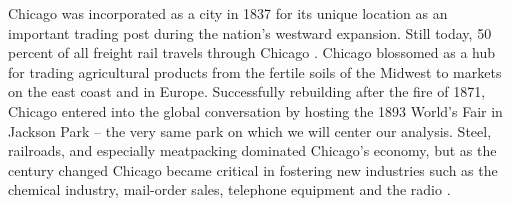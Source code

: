 \documentclass[12pt]{article}
\begin{document}
Chicago was incorporated as a city in 1837 for its unique location as an important trading post during the nation's westward expansion. Still today, 50 percent of all freight rail travels through Chicago \citep{chicagohistory}. Chicago blossomed as a hub for trading agricultural products from the fertile soils of the Midwest to markets on the east coast and in Europe. Successfully rebuilding after the fire of 1871, Chicago entered into the global conversation by hosting the 1893 World's Fair in Jackson Park -- the very same park on which we will center our analysis. Steel, railroads, and especially meatpacking dominated Chicago's economy, but as the century changed Chicago became critical in fostering new industries such as the chemical industry, mail-order sales, telephone equipment and the radio \citep{chicagobrit}. 
\end{document}
